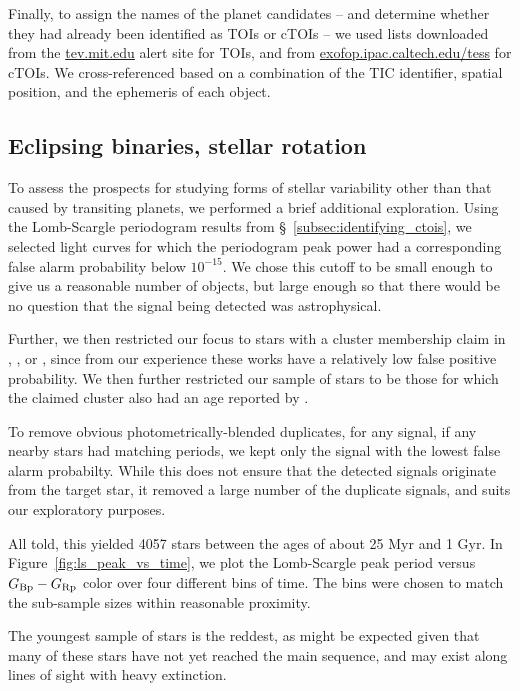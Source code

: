 \documentclass[12pt,twocolumn,tighten]{aastex62}
\begin{document}
Finally, to assign the names of the planet candidates -- and determine
whether they had already been identified as TOIs or cTOIs -- we used
lists downloaded from the \url{tev.mit.edu} alert site for TOIs, and
from \url{exofop.ipac.caltech.edu/tess} for cTOIs.  We
cross-referenced based on a combination of the TIC identifier, spatial
position, and the ephemeris of each object.


\subsection{Eclipsing binaries, stellar rotation}
\label{subsec:notplanets}

To assess the prospects for studying forms of stellar variability
other than that caused by transiting planets, we performed a brief
additional exploration.
Using the Lomb-Scargle periodogram results from
\S~\ref{subsec:identifying_ctois}, we selected light curves 
for which the periodogram peak power had a corresponding false alarm
probability below $10^{-15}$.
We chose this cutoff to be small enough to give us a reasonable number
of objects, but large enough so that there would be no question that
the signal being detected was astrophysical.

Further, we then restricted our focus to stars with a cluster
membership claim in \citet{cantat-gaudin_gaia_2018},
\citet{Kharchenko_et_al_2013}, or \citet{gaia_hr_2018}, since from our
experience these works have a relatively low false positive
probability.
We then further restricted our sample of stars to be those for which
the claimed cluster also had an age reported by
\citet{Kharchenko_et_al_2013}.

To remove obvious photometrically-blended duplicates, for any signal,
if any nearby stars had matching periods, we kept only the signal with
the lowest false alarm probabilty.
While this does not ensure that the detected signals originate from
the target star, it removed a large number of the duplicate signals,
and suits our exploratory purposes.

All told, this yielded 4057 stars between the ages of about 25 Myr and
1 Gyr.
In Figure~\ref{fig:ls_peak_vs_time}, we plot the Lomb-Scargle peak period
versus $G_{\rm Bp} - G_{\rm Rp}$ color over four different bins of
time.
The bins were chosen to match the sub-sample sizes within reasonable
proximity.

The youngest sample of stars is the reddest, as might be expected
given that many of these stars have not yet reached the main sequence,
and may exist along lines of sight with heavy extinction.
\end{document}
